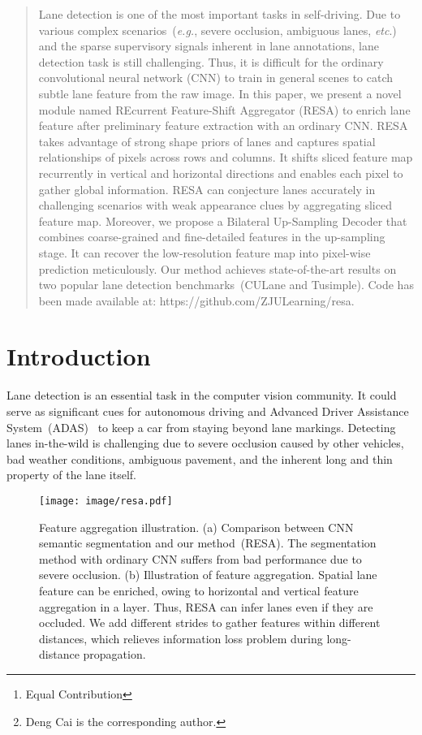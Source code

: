 \documentclass[letterpaper]{article} \usepackage{aaai21}  \usepackage{times}  \usepackage{helvet} \usepackage{courier}  \usepackage[hyphens]{url}  \usepackage{graphicx} \urlstyle{rm} \def\UrlFont{\rm}  \usepackage{natbib}  \usepackage{caption} \frenchspacing  \setlength{\pdfpagewidth}{8.5in}  \setlength{\pdfpageheight}{11in}  \usepackage{amsmath}
\author {
Tu Zheng\textsuperscript{\rm 1,2}\thanks{Equal Contribution},
    Hao Fang\textsuperscript{\rm 1}\footnotemark[1],
    Yi Zhang\textsuperscript{\rm 1},
    Wenjian Tang\textsuperscript{\rm 2},
    Zheng Yang\textsuperscript{\rm 2},
    HaiFeng Liu\textsuperscript{\rm 1},
    Deng Cai\textsuperscript{\rm 1,2}\thanks{Deng Cai is the corresponding author.}\\
}
\begin{document}
\maketitle

\begin{abstract}
Lane detection is one of the most important tasks in self-driving. Due to various complex scenarios~(\emph{e.g.}, severe occlusion, ambiguous lanes, \emph{etc}.) and the sparse supervisory signals inherent in lane annotations, lane detection task is still challenging. Thus, it is difficult for the ordinary convolutional neural network (CNN) to train in general scenes to catch subtle lane feature from the raw image. In this paper, we present a novel module named REcurrent Feature-Shift Aggregator (RESA) to enrich lane feature after preliminary feature extraction with an ordinary CNN. RESA takes advantage of strong shape priors of lanes and captures spatial relationships of pixels across rows and columns. It shifts sliced feature map recurrently in vertical and horizontal directions and enables each pixel to gather global information. RESA can conjecture lanes accurately in challenging scenarios with weak appearance clues by aggregating sliced feature map. Moreover, we propose a Bilateral Up-Sampling Decoder that combines coarse-grained and fine-detailed features in the up-sampling stage. It can recover the low-resolution feature map into pixel-wise prediction meticulously. Our method achieves state-of-the-art results on two popular lane detection benchmarks~(CULane and Tusimple). Code has been made available at: https://github.com/ZJULearning/resa. 
\end{abstract}

\section{Introduction}
Lane detection is an essential task in the computer vision community. It could serve as significant cues for autonomous driving and Advanced Driver Assistance System~(ADAS)~\citep{survey} to keep a car from staying beyond lane markings. Detecting lanes in-the-wild is challenging due to severe occlusion caused by other vehicles, bad weather conditions, ambiguous pavement, and the inherent long and thin property of the lane itself.

\begin{figure}[!t]
\centering
\texttt{[image: image/resa.pdf]}
\caption{
Feature aggregation illustration.
(a) Comparison between CNN semantic segmentation and our method~(RESA). The segmentation method with ordinary CNN suffers from bad performance due to severe occlusion. (b) Illustration of feature aggregation. Spatial lane feature can be enriched, owing to horizontal and vertical feature aggregation in a layer. Thus, RESA can infer lanes even if they are occluded. We add different strides to gather features within different distances, which relieves information loss problem during long-distance propagation.}
\vspace{-5pt}
\label{arch_0}
\end{figure}
\end{document}
